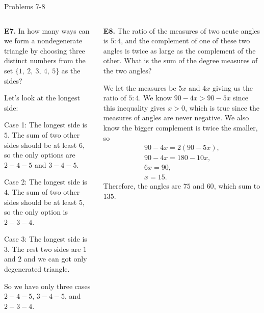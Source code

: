 \documentclass[9pt,aspectratio=169,handout]{beamer}
\begin{document}
\begin{frame}{Problems 7-8}
  \begin{columns}[T]
    \begin{column}{0.5\textwidth}
      \begin{problem}
        \textbf{E7.} In how many ways can we form a nondegenerate triangle by choosing three distinct
        numbers from the set $\{1,\ 2,\ 3,\ 4,\ 5\}$ as the sides?
      \end{problem}\pause
      Let's look at the longest side: 

      Case 1: The longest side is $5$. The sum of two other sides should be at least $6$, so the only options are $2-4-5$ and $3-4-5$.

      Case 2: The longest side is $4$. The sum of two other sides should be at least $5$, so the only option is $2-3-4$.

      Case 3: The longest side is $3$. The rest two sides are $1$ and $2$ and we can got only degenerated triangle.

      So we have only three cases $2-4-5$, $3-4-5$, and $2-3-4$.\pause
    \end{column}
    \begin{column}{0.5\textwidth}
      \begin{problem}
        \textbf{E8.} The ratio of the measures of two acute angles is $5:4$, and the complement of one of these two angles is twice as large as the complement of the other. What is the sum of the degree measures of the two angles?
      \end{problem}\pause
      We let the measures be $5x$ and $4x$ giving us the ratio of $5:4$. We know $90-4x>90-5x$ since this inequality gives $x>0$, which is true since the measures of angles are never negative. We also know the bigger complement is twice the smaller, so
      \begin{gather*}
        90-4x=2(90-5x),\\
        90-4x=180-10x,\\
        6x=90,\\
        x=15.
      \end{gather*}
      Therefore, the angles are $75$ and $60$, which sum to $\boxed{135}$.
    \end{column}
  \end{columns}
\end{frame}
\end{document}
